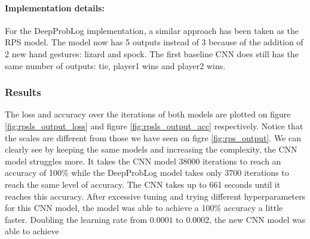 \paragraph{Implementation details:} For the DeepProbLog implementation, a similar approach has been taken as the RPS model. The model now has 5 outputs instead of 3 because of the addition of 2 new hand gestures: lizard and spock. The first baseline CNN does still has the same number of outputs: tie, player1 wins and player2 wins. 

\subsubsection{Results}
The loss and accuracy over the iterations of both models are plotted on figure \ref{fig:rpsls_output_loss} and figure \ref{fig:rpsls_output_acc} respectively. Notice that the scales are different from those we have seen on figre \ref{fig:rps_output}. We can clearly see by keeping the same models and increasing the complexity, the CNN model struggles more. It takes the CNN model 38000 iterations to reach an accuracy of 100\% while the DeepProbLog model takes only 3700 iterations to reach the same level of accuracy. The CNN takes up to 661 seconds until it reaches this accuracy. After excessive tuning and trying different hyperparameters for this CNN model, the model was able to achieve a 100\% accuracy a little faster. Doubling the learning rate from $0.0001$ to $0.0002$, the new CNN model was able to achieve 


